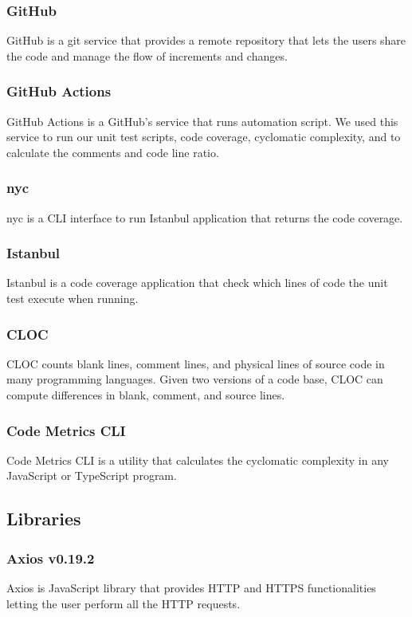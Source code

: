 \subsubsection{GitHub}
GitHub is a git service that provides a remote repository that lets the users share the code and manage the flow of increments and changes.

\subsubsection{GitHub Actions}
GitHub Actions is a GitHub's service that runs automation script.
We used this service to run our unit test scripts, code coverage, cyclomatic complexity, and to calculate the comments and code line ratio.

\subsubsection{nyc}
nyc is a CLI interface to run Istanbul application that returns the code coverage.

\subsubsection{Istanbul}
Istanbul is a code coverage application that check which lines of code the unit test execute when running.

\subsubsection{CLOC}
CLOC counts blank lines, comment lines, and physical lines of source code in many programming languages. Given two versions of a code base, CLOC can compute differences in blank, comment, and source lines.

\subsubsection{Code Metrics CLI}
Code Metrics CLI is a utility that calculates the cyclomatic complexity in any JavaScript or TypeScript program.


\subsection{Libraries}

\subsubsection{Axios v0.19.2}
Axios is JavaScript library that provides HTTP and HTTPS functionalities letting the user perform all the HTTP requests.

